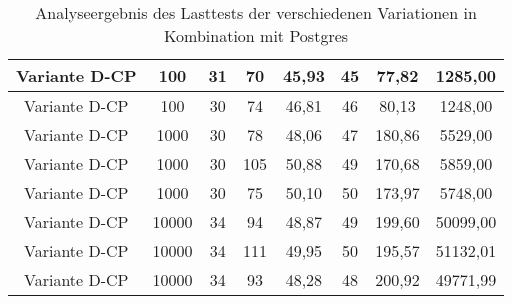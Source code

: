 \begin{anhang}
\begin{landscape}
\begin{table}[h!]
\begin{tabular}{ |c|c|c|c|c|c|c|c|}
			\hline
			Variante D-CP & 100 & 31 & 70 & 45,93 & 45 & 77,82 & 1285,00 \\
			\hline
			Variante D-CP & 100 & 30 & 74 & 46,81 & 46 & 80,13 & 1248,00 \\
			\hline
			Variante D-CP & 1000 & 30 & 78 & 48,06 & 47 & 180,86 & 5529,00 \\
			\hline
			Variante D-CP & 1000 & 30 & 105 & 50,88 & 49 & 170,68 & 5859,00 \\
			\hline
			Variante D-CP & 1000 & 30 & 75 & 50,10 & 50 & 173,97 & 5748,00 \\
			\hline
			Variante D-CP & 10000 & 34 & 94 & 48,87 & 49 & 199,60 & 50099,00 \\
			\hline
			Variante D-CP & 10000 & 34 & 111 & 49,95 & 50 & 195,57 & 51132,01 \\
			\hline
			Variante D-CP & 10000 & 34 & 93 & 48,28 & 48 & 200,92 & 49771,99 \\
			\hline
		\end{tabular}
		\caption{Analyseergebnis des Lasttests der verschiedenen Variationen in Kombination mit Postgres}
		\label{fig:performance-postgres}
	\end{table}
\end{landscape}


\end{anhang}
